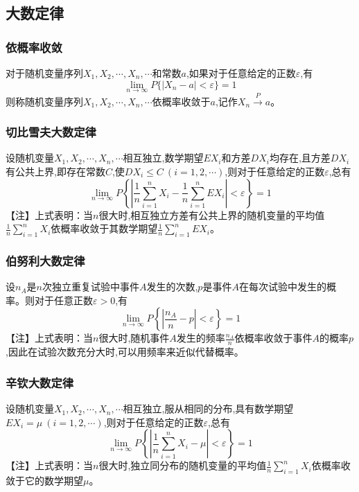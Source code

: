 \documentclass[UTF8]{ctexart}
\theoremstyle{remark}
\begin{document}
		\subsection{大数定律}
		\subsubsection{依概率收敛}
		对于随机变量序列\(X_1, X_2, \cdots, X_n, \cdots\)和常数\(a\),如果对于任意给定的正数\(\varepsilon\),有
		\[
		\lim_{n \to \infty} P\{|X_n - a| < \varepsilon\} = 1
		\]
		则称随机变量序列\(X_1, X_2, \cdots, X_n, \cdots\)依概率收敛于\(a\),记作\(X_n \stackrel{P}{\longrightarrow} a\)。
		
		\subsubsection{切比雪夫大数定律}
		设随机变量\(X_1, X_2, \cdots, X_n, \cdots\)相互独立,数学期望\(EX_i\)和方差\(DX_i\)均存在,且方差\(DX_i\)有公共上界,即存在常数\(C\),使\(DX_i \leq C\ (i = 1,2,\cdots)\),则对于任意给定的正数\(\varepsilon\),总有
		\[
		\lim_{n \to \infty} P\left\{\left|\frac{1}{n}\sum_{i = 1}^{n}X_i - \frac{1}{n}\sum_{i = 1}^{n}EX_i\right| < \varepsilon\right\} = 1
		\]
		【注】上式表明：当\(n\)很大时,相互独立方差有公共上界的随机变量的平均值\(\frac{1}{n}\sum_{i = 1}^{n}X_i\)依概率收敛于其数学期望\(\frac{1}{n}\sum_{i = 1}^{n}EX_i\)。
		
		\subsubsection{伯努利大数定律}
		
		设\(n_A\)是\(n\)次独立重复试验中事件\(A\)发生的次数,\(p\)是事件\(A\)在每次试验中发生的概率。则对于任意正数\(\varepsilon > 0\),有
		\[
		\lim_{n \to \infty} P\left\{\left|\frac{n_A}{n} - p\right| < \varepsilon\right\} = 1
		\]
		【注】上式表明：当\(n\)很大时,随机事件\(A\)发生的频率\(\frac{n_A}{n}\)依概率收敛于事件\(A\)的概率\(p\),因此在试验次数充分大时,可以用频率来近似代替概率。
		
		\subsubsection{辛钦大数定律}
		设随机变量\(X_1, X_2, \cdots, X_n, \cdots\)相互独立,服从相同的分布,具有数学期望\(EX_i = \mu\ (i = 1,2,\cdots)\),则对于任意给定的正数\(\varepsilon\),总有
		\[
		\lim_{n \to \infty} P\left\{\left|\frac{1}{n}\sum_{i = 1}^{n}X_i - \mu\right| < \varepsilon\right\} = 1
		\]
		【注】上式表明：当\(n\)很大时,独立同分布的随机变量的平均值\(\frac{1}{n}\sum_{i = 1}^{n}X_i\)依概率收敛于它的数学期望\(\mu\)。
		
\end{document}
